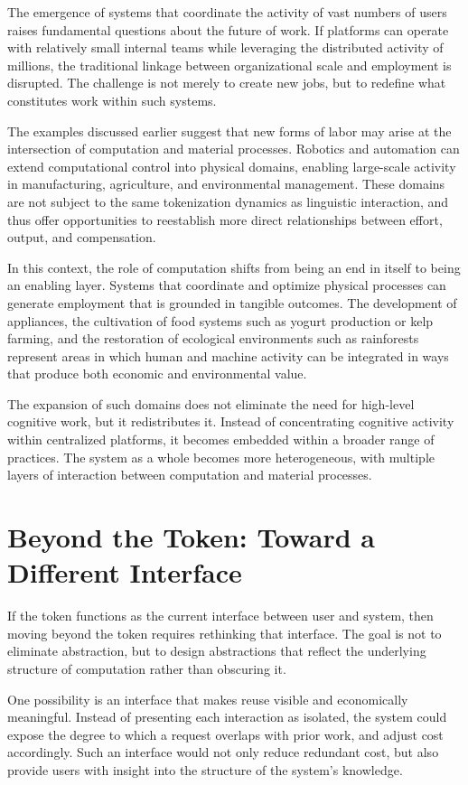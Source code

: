 \documentclass[12pt, oneside]{article}
\begin{document}
The emergence of systems that coordinate the activity of vast numbers of users raises fundamental questions about the future of work. If platforms can operate with relatively small internal teams while leveraging the distributed activity of millions, the traditional linkage between organizational scale and employment is disrupted. The challenge is not merely to create new jobs, but to redefine what constitutes work within such systems.

The examples discussed earlier suggest that new forms of labor may arise at the intersection of computation and material processes. Robotics and automation can extend computational control into physical domains, enabling large-scale activity in manufacturing, agriculture, and environmental management. These domains are not subject to the same tokenization dynamics as linguistic interaction, and thus offer opportunities to reestablish more direct relationships between effort, output, and compensation.

In this context, the role of computation shifts from being an end in itself to being an enabling layer. Systems that coordinate and optimize physical processes can generate employment that is grounded in tangible outcomes. The development of appliances, the cultivation of food systems such as yogurt production or kelp farming, and the restoration of ecological environments such as rainforests represent areas in which human and machine activity can be integrated in ways that produce both economic and environmental value.

The expansion of such domains does not eliminate the need for high-level cognitive work, but it redistributes it. Instead of concentrating cognitive activity within centralized platforms, it becomes embedded within a broader range of practices. The system as a whole becomes more heterogeneous, with multiple layers of interaction between computation and material processes.

\section{Beyond the Token: Toward a Different Interface}

If the token functions as the current interface between user and system, then moving beyond the token requires rethinking that interface. The goal is not to eliminate abstraction, but to design abstractions that reflect the underlying structure of computation rather than obscuring it.

One possibility is an interface that makes reuse visible and economically meaningful. Instead of presenting each interaction as isolated, the system could expose the degree to which a request overlaps with prior work, and adjust cost accordingly. Such an interface would not only reduce redundant cost, but also provide users with insight into the structure of the system’s knowledge.
\end{document}
